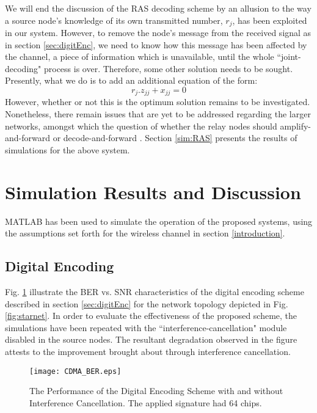 \documentclass[conference]{IEEEtran}
\begin{document}
We will end the discussion of the RAS decoding scheme by an allusion to the way a source node's knowledge of its own transmitted number, $r_j$, has been exploited in our system. However, to remove the node's message from the received signal as in section \ref{sec:digitEnc}, we need to know how this message has been affected by the channel, a piece of information which is unavailable, until the whole ``joint-decoding" process is over. Therefore, some other solution needs to be sought. Presently, what we do is to add an additional equation of the form:
\begin{equation}
r_j . z_{jj} + x_{jj} = 0
\label{extraeq}
\end{equation}
However, whether or not this is the optimum solution remains to be investigated. Nonetheless, there remain issues that are yet to be addressed regarding the larger networks, amongst which the question of whether the relay nodes should amplify-and-forward or decode-and-forward \cite{nuzdah}. Section \ref{sim:RAS} presents the results of simulations for the above system.

\section{Simulation Results and Discussion}\label{sec:sim}
MATLAB\textsuperscript{\textregistered} has been used to simulate the operation of the proposed systems, using the assumptions set forth for the wireless channel in section \ref{introduction}.

\subsection{Digital Encoding}\label{sim:dig}
Fig. \ref{fig:digital} illustrate the BER vs. SNR characteristics of the digital encoding scheme described in section \ref{sec:digitEnc} for the network topology depicted in Fig. \ref{fig:starnet}. In order to evaluate the effectiveness of the proposed scheme, the simulations have been repeated with the ``interference-cancellation" module disabled in the source nodes. The resultant degradation observed in the figure attests to the improvement brought about through interference cancellation.

\begin{figure}[tp]
     \centering
           \texttt{[image: CDMA\_BER.eps]}
     \caption{The Performance of the Digital Encoding Scheme with and without Interference Cancellation. The applied signature had 64 chips.}
     \label{fig:digital}
\end{figure}
\end{document}
